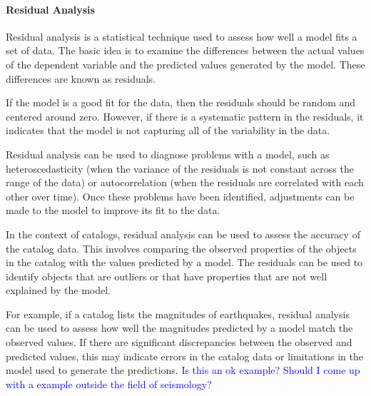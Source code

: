 \documentclass[12pt]{article} %
\theoremstyle{plain}
\begin{document}
	\paragraph{Residual Analysis}
	
	Residual analysis is a statistical technique used to assess how well a model fits a set of data. The basic idea is to examine the differences between the actual values of the dependent variable and the predicted values generated by the model. These differences are known as residuals.

	If the model is a good fit for the data, then the residuals should be random and centered around zero. However, if there is a systematic pattern in the residuals, it indicates that the model is not capturing all of the variability in the data.

	Residual analysis can be used to diagnose problems with a model, such as heteroscedasticity (when the variance of the residuals is not constant across the range of the data) or autocorrelation (when the residuals are correlated with each other over time). Once these problems have been identified, adjustments can be made to the model to improve its fit to the data.

	In the context of catalogs, residual analysis can be used to assess the accuracy of the catalog data. This involves comparing the observed properties of the objects in the catalog with the values predicted by a model. The residuals can be used to identify objects that are outliers or that have properties that are not well explained by the model.

	For example, if a catalog lists the magnitudes of earthquakes, residual analysis can be used to assess how well the  magnitudes predicted by a model match the observed values. If there are significant discrepancies between the observed and predicted values, this may indicate errors in the catalog data or limitations in the model used to generate the predictions. \textcolor{blue}{Is this an ok example? Should I come up with a example outside the field of seismology?}
	
\end{document}

